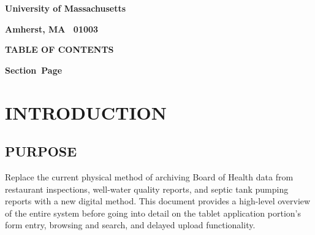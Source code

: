 \documentclass[twoside,letterpaper]{article}
\begin{document}
{\centering{}\bfseries\color{black}
University of Massachusetts
\par}

{\centering{}\bfseries\color{black}
Amherst, MA \ 01003
\par}



{\centering{}\bfseries\color{black}
TABLE OF CONTENTS
\par}


\bigskip

{\bfseries\color{black}
Section\ \hfill  Page}

\setcounter{tocdepth}{9}
\renewcommand\contentsname{}
\tableofcontents

\bigskip

\clearpage\clearpage\setcounter{page}{1}\pagestyle{Convertii}
\section[INTRODUCTION]{\rmfamily\bfseries\color{black}
INTRODUCTION}

\subsection[PURPOSE]{\rmfamily\bfseries\color{black}
PURPOSE}
{\rmfamily\color{black}
Replace the current physical method of archiving Board of Health data from restaurant inspections, well-water quality reports, and septic tank pumping reports with a new digital method. This document provides a high-level overview of the entire system before going into detail on the tablet application portion's form entry, browsing and search, and delayed upload functionality.
}


\end{document}
